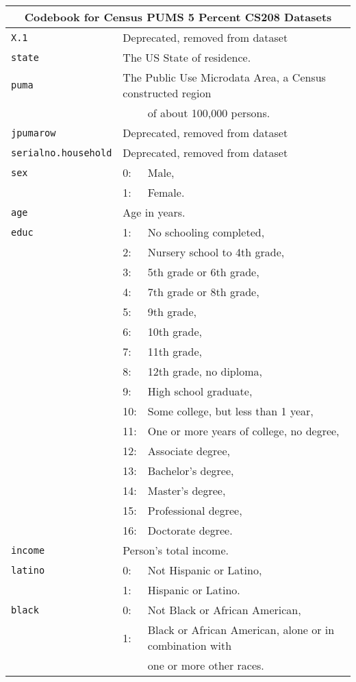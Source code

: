 \begin{tabular}{lll}
\multicolumn{3}{c}{\textbf{Codebook for Census PUMS 5 Percent CS208 Datasets}}\\
\hline
\texttt{X.1} &\multicolumn{2}{l}{Deprecated, removed from dataset}\\
\texttt{state} &\multicolumn{2}{l}{The US State of residence.}\\
\texttt{puma} &\multicolumn{2}{l}{The Public Use Microdata Area, a Census constructed region}\\ 
&& of about 100,000 persons.\\
\texttt{jpumarow} &\multicolumn{2}{l}{Deprecated, removed from dataset}\\
\texttt{serialno.household} &\multicolumn{2}{l}{Deprecated, removed from dataset}\\
\texttt{sex} & 0: &Male, \\
            &    1: &Female.\\
\texttt{age} &\multicolumn{2}{l}{Age in years.}\\
\texttt{educ} & 1:&		No schooling completed,\\
&2:&		Nursery school to 4th grade,\\
&3:&		5th grade or 6th grade,\\
&4:&		7th grade or 8th grade,\\
&5:&		9th grade,\\
&6:&		10th grade,\\
&7:&		11th grade,\\
&8:&		12th grade, no diploma,\\
&9:&		High school graduate,\\
&10:&		Some college, but less than 1 year,\\
&11:&		One or more years of college, no degree,\\
&12:&		Associate degree,\\
&13:&		Bachelor's degree,\\
&14:&		Master's degree,\\
&15:&		Professional degree,\\
&16:&		Doctorate degree.\\
\texttt{income} &\multicolumn{2}{l}{Person's total income.} \\
\texttt{latino} & 0: & Not Hispanic or Latino,\\
                & 1: & Hispanic or Latino.\\
\texttt{black} & 0: & Not Black or African American,\\
               & 1: & Black or African American, alone or in combination with\\ && one or more other races.\\

\end{tabular}
